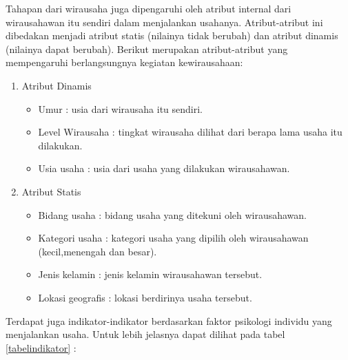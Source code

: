 \documentclass[a4paper,twoside]{article}
\begin{document}
\begin{enumerate}
Tahapan dari wirausaha juga dipengaruhi oleh atribut internal dari wirausahawan itu sendiri dalam menjalankan usahanya. Atribut-atribut ini dibedakan menjadi atribut statis (nilainya tidak berubah) dan atribut dinamis (nilainya dapat berubah). Berikut merupakan atribut-atribut yang mempengaruhi berlangsungnya kegiatan kewirausahaan:
			\begin{enumerate}
				\item Atribut Dinamis
					\begin{itemize}
						\item Umur : usia dari wirausaha itu sendiri.
						\item Level Wirausaha : tingkat wirausaha dilihat dari berapa lama usaha itu dilakukan.
						\item Usia usaha : usia dari usaha yang dilakukan wirausahawan.
					\end{itemize}
				\item Atribut Statis
					\begin{itemize}
						\item Bidang usaha : bidang usaha yang ditekuni oleh wirausahawan.
						\item Kategori usaha : kategori usaha yang dipilih oleh wirausahawan (kecil,menengah dan besar).
						\item Jenis kelamin : jenis kelamin wirausahawan tersebut.
						\item Lokasi geografis : lokasi berdirinya usaha tersebut.
					\end{itemize}
			\end{enumerate}

Terdapat juga indikator-indikator berdasarkan faktor psikologi individu yang menjalankan usaha. Untuk lebih jelasnya dapat dilihat pada tabel \ref{tabelindikator} :


\end{enumerate}
\end{document}
